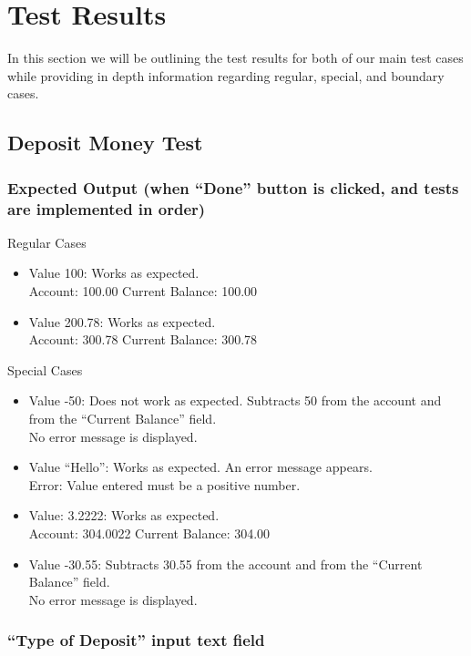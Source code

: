 \documentclass[12pt]{article}
\begin{document}
\section{Test Results}

In this section we will be outlining the test results for both of our main test cases while providing in depth information regarding regular, special, and boundary cases. 

\subsection{Deposit Money Test}

\subsubsection{Expected Output (when “Done” button is clicked, and tests are implemented in order)}

Regular Cases
\begin{itemize}
  \item Value 100: Works as expected.\\
Account: 100.00 Current Balance: 100.00
  \item Value 200.78: Works as expected.\\
Account: 300.78 Current Balance: 300.78
\end{itemize}

Special Cases
\begin{itemize}
  \item Value -50: Does not work as expected. Subtracts 50 from the account and from the “Current Balance” field.\\
No error message is displayed.
  \item Value “Hello”: Works as expected. An error message appears.\\
Error: Value entered must be a positive number.
  \item Value: 3.2222: Works as expected.\\
Account: 304.0022 Current Balance: 304.00
  \item Value -30.55: Subtracts 30.55 from the account and from the “Current Balance” field.\\
No error message is displayed.
\end{itemize}

\subsubsection{“Type of Deposit” input text field}
\end{document}
